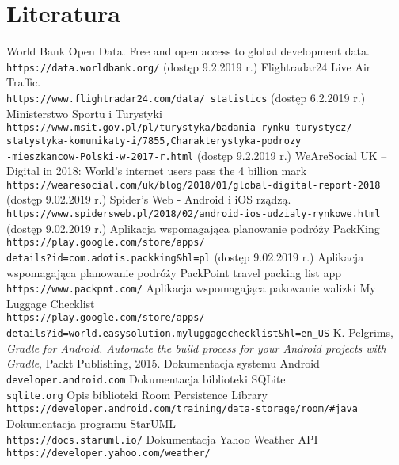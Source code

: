 \documentclass[a4paper,12pt]{article}
\begin{document}
\newpage
\section{Literatura}
\begingroup
\renewcommand{\section}[2]{}%
\begin{thebibliography}{14}
		World Bank Open Data. Free and open access to global development data. \\
		\texttt{https://data.worldbank.org/} (dostęp 9.2.2019 r.)
		Flightradar24 Live Air Traffic. \\
		\texttt{https://www.flightradar24.com/data/
		statistics} (dostęp 6.2.2019 r.)
		Ministerstwo Sportu i Turystyki \\
		\texttt{https://www.msit.gov.pl/pl/turystyka/badania-rynku-turystycz/\\statystyka-komunikaty-i/7855,Charakterystyka-podrozy\\-mieszkancow-Polski-w-2017-r.html} (dostęp 9.2.2019 r.)
		WeAreSocial UK – Digital in 2018: World’s internet users pass the 4 billion mark %
		\texttt{https://wearesocial.com/uk/blog/2018/01/global-digital-report-2018} \\ (dostęp 9.02.2019 r.)
		Spider's Web - Android i iOS rządzą. \\
		\texttt{https://www.spidersweb.pl/2018/02/android-ios-udzialy-rynkowe.html} \\ (dostęp 9.02.2019 r.)
		Aplikacja wspomagająca planowanie podróży PackKing \\
		\texttt{https://play.google.com/store/apps/\\details?id=com.adotis.packking\&hl=pl} (dostęp 9.02.2019 r.)
		Aplikacja wspomagająca planowanie podróży PackPoint travel packing list app \\
		\texttt{https://www.packpnt.com/}
		Aplikacja wspomagająca pakowanie walizki My Luggage Checklist \\
		\texttt{https://play.google.com/store/apps/\\details?id=world.easysolution.myluggagechecklist\&hl=en\_US}
		K. Pelgrims, \textit{Gradle for Android. Automate the build process for your Android projects with Gradle}, Packt Publishing, 2015.
		Dokumentacja systemu Android \\
		\texttt{developer.android.com}
		Dokumentacja biblioteki SQLite \\
		\texttt{sqlite.org}
		Opis biblioteki Room Persistence Library \\
		\texttt{https://developer.android.com/training/data-storage/room/\#java}	
		Dokumentacja programu StarUML \\
		\texttt{https://docs.staruml.io/}
		Dokumentacja Yahoo Weather API \\
		\texttt{https://developer.yahoo.com/weather/}
\end{thebibliography}
\endgroup
\end{document}
